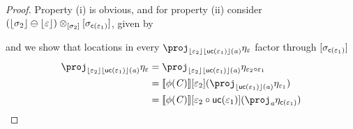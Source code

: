 \begin{proof}
    Property (i) is obvious, and for property (ii) consider $(\lfloor\sigma_2\rfloor \ominus \lfloor\varepsilon\rfloor) \otimes_{[\sigma_2]} [\sigma_{\mathsf{c}(\varepsilon_1)}]$, given by
    \begin{center}
    \end{center}
    and we show that locations in every $\proj_{\concL{\me_2}\concL{\uncon{\me_1}}(\va)} \mvarM_\me$ factor through $[\sigma_{\mathsf{c}(\varepsilon_1)}]$ 
    \begin{align*}
        \proj_{\concL{\me_2}\concL{\uncon{\me_1}}(\va)} \mvarM_\me & = \proj_{\concL{\me_2}\concL{\uncon{\me_1}}(\va)} \mvarM_{\me_2 \comp \me_1} \\
                                                                    & = \sem{\phi(\vC)}\anyL{\me_2}(\proj_{\concL{\uncon{\me_1}}(\va)} \mvarM_{\me_1}) \\
                                                                    & = \sem{\phi(\vC)}\anyL{\me_2 \comp \uncon{\me_1}}(\proj_\va \mvarM_{\con{\me_1}})
    \end{align*}


\end{proof}
